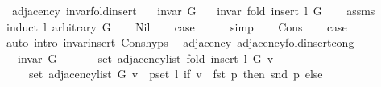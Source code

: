 \begin{isabellebody}
%
\endisatagproof
{\isafoldproof}%
%
\isadelimproof
\isanewline
%
\endisadelimproof
\isanewline
{}\isamarkupfalse%
\ {\isacharparenleft}{\kern0pt}\ adjacency{\isacharparenright}{\kern0pt}\ invar{\isacharunderscore}{\kern0pt}fold{\isacharunderscore}{\kern0pt}insert{\isacharcolon}{\kern0pt}\isanewline
\ \ \ {\isachardoublequoteopen}invar\ G{\isachardoublequoteclose}\isanewline
\ \ \ {\isachardoublequoteopen}invar\ {\isacharparenleft}{\kern0pt}fold\ insert\ l\ G{\isacharparenright}{\kern0pt}{\isachardoublequoteclose}\isanewline
%
\isadelimproof
\ \ %
\endisadelimproof
%
\isatagproof
{}\isamarkupfalse%
\ assms\isanewline
{}\isamarkupfalse%
\ {\isacharparenleft}{\kern0pt}induct\ l\ arbitrary{\isacharcolon}{\kern0pt}\ G{\isacharparenright}{\kern0pt}\isanewline
\ \ \isamarkupfalse%
\ Nil\isanewline
\ \ \isamarkupfalse%
\ {\isacharquery}{\kern0pt}case\isanewline
\ \ \ \ \isamarkupfalse%
\ simp\isanewline
{}\isamarkupfalse%
\isanewline
\ \ \isamarkupfalse%
\ Cons\isanewline
\ \ \isamarkupfalse%
\ {\isacharquery}{\kern0pt}case\isanewline
\ \ \ \ \isamarkupfalse%
\ {\isacharparenleft}{\kern0pt}auto\ intro{\isacharcolon}{\kern0pt}\ invar{\isacharunderscore}{\kern0pt}insert\ Cons{\isachardot}{\kern0pt}hyps{\isacharparenright}{\kern0pt}\isanewline
{}\isamarkupfalse%
%
\endisatagproof
{\isafoldproof}%
%
\isadelimproof
\isanewline
%
\endisadelimproof
\isanewline
{}\isamarkupfalse%
\ {\isacharparenleft}{\kern0pt}\ adjacency{\isacharparenright}{\kern0pt}\ adjacency{\isacharunderscore}{\kern0pt}fold{\isacharunderscore}{\kern0pt}insert{\isacharunderscore}{\kern0pt}cong{\isacharcolon}{\kern0pt}\isanewline
\ \ \ {\isachardoublequoteopen}invar\ G{\isachardoublequoteclose}\isanewline
\ \ \isanewline
\ \ \ \ {\isachardoublequoteopen}set\ {\isacharparenleft}{\kern0pt}adjacency{\isacharunderscore}{\kern0pt}list\ {\isacharparenleft}{\kern0pt}fold\ insert\ l\ G{\isacharparenright}{\kern0pt}\ v{\isacharparenright}{\kern0pt}\ {\isacharequal}{\kern0pt}\isanewline
\ \ \ \ \ set\ {\isacharparenleft}{\kern0pt}adjacency{\isacharunderscore}{\kern0pt}list\ G\ v{\isacharparenright}{\kern0pt}\ {\isasymunion}\ {\isacharparenleft}{\kern0pt}{\isasymUnion}p{\isasymin}set\ l{\isachardot}{\kern0pt}\ if\ v\ {\isacharequal}{\kern0pt}\ fst\ p\ then\ {\isacharbraceleft}{\kern0pt}snd\ p{\isacharbraceright}{\kern0pt}\ else\ {\isacharbraceleft}{\kern0pt}{\isacharbraceright}{\kern0pt}{\isacharparenright}{\kern0pt}{\isachardoublequoteclose}\isanewline

\end{isabellebody}
